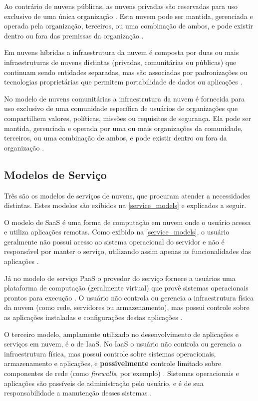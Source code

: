 Ao contrário de nuvens públicas, as nuvens privadas são reservadas para uso exclusivo de uma única organização \cite{public2}. Esta nuvem pode ser mantida, gerenciada e operada pela organização, terceiros, ou uma combinação de ambos, e pode existir dentro ou fora das premissas da organização \cite{nist}.

Em nuvens híbridas a infraestrutura da nuvem é composta por duas ou mais infraestruturas de nuvens distintas (privadas, comunitárias ou públicas) que continuam sendo entidades separadas, mas são associadas por padronizações ou tecnologias proprietárias que permitem portabilidade de dados ou aplicações \cite{nist}. 

No modelo de nuvens comunitárias a infraestrutura da nuvem é fornecida para uso exclusivo de uma comunidade específica de usuários de organizações que compartilhem valores, políticas, missões ou requisitos de segurança. Ela pode ser mantida, gerenciada e operada por uma ou mais organizações da comunidade, terceiros, ou uma combinação de ambos, e pode existir dentro ou fora da organização \cite{nist}.

\subsection{Modelos de Serviço}

Três são os modelos de serviços de nuvens, que procuram atender a necessidades distintas. Estes modelos são exibidos na \autoref{service_models} e explicados a seguir.

O modelo de \ac{SaaS} é uma forma de computação em nuvem onde o usuário acessa e utiliza aplicações remotas. Como exibido na \autoref{service_models}, o usuário geralmente não possui acesso ao sistema operacional do servidor e não é responsável por manter o serviço, utilizando assim apenas as funcionalidades das aplicações \cite{servicemodels}.

Já no modelo de serviço \ac{PaaS} o provedor do serviço fornece a usuários uma plataforma de computação (geralmente virtual) que provê sistemas operacionais prontos para execução \cite{servicemodels}. O usuário não controla ou gerencia a infraestrutura física da nuvem (como rede, servidores ou armazenamento), mas possui controle sobre as aplicações instaladas e configurações destas aplicações \cite{nist}.

O terceiro modelo, amplamente utilizado no desenvolvimento de aplicações e serviços em nuvem, é o de \ac{IaaS}. No \ac{IaaS} o usuário não controla ou gerencia a infraestrutura física, mas possui controle sobre sistemas operacionais, armazenamento e aplicações, e \textbf{possivelmente} controle limitado sobre componentes de rede (como \textit{firewalls}, por exemplo) \cite{nist}. Sistemas operacionais e aplicações são passíveis de administração pelo usuário, e é de sua responsabilidade a manutenção desses sistemas \cite{servicemodels}.  


